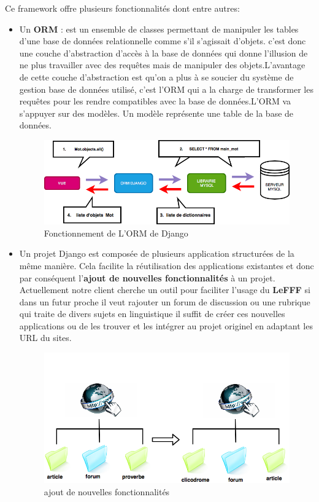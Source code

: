 \documentclass[a4paper, 12pt]{article}
\begin{document}
Ce framework offre plusieurs fonctionnalités dont entre autres:
\begin{itemize}
    \item Un \textbf{ORM} : est un ensemble de classes permettant de manipuler les tables d’une base de données relationnelle comme s’il s’agissait d’objets. c'est donc une couche d’abstraction d’accès à la base de données qui donne l’illusion de ne plus travailler avec des requêtes mais de manipuler des objets.L’avantage de cette couche d’abstraction est qu’on a plus à se soucier du système de gestion base de données utilisé, c’est l’ORM qui a la charge de transformer les requêtes pour les rendre compatibles avec la base de données.L’ORM va s’appuyer sur des modèles. Un modèle représente une table de la base de données.
    \begin{figure}[H] 
    \centering
    \includegraphics[scale=0.65]{orm.png}
    \caption{Fonctionnement de L'ORM de Django }
    \end{figure}
    \item Un projet Django est composée de plusieurs application structurées de la même manière. Cela facilite la réutilisation des applications existantes et  donc par conséquent l'\textbf{ajout de nouvelles fonctionnalités} à un projet. Actuellement notre client cherche un outil pour faciliter l'usage du \textbf{LeFFF} si dans un futur proche il veut rajouter un forum de discussion ou une rubrique qui traite de divers sujets en linguistique il suffit de créer ces nouvelles applications ou de les trouver et les intégrer au projet originel en adaptant les URL du sites. 
    \begin{figure}[H] 
    \centering
    \includegraphics[scale=0.65]{portabilite.png}
    \caption{ajout de nouvelles fonctionnalités }
    \end{figure}
\end{itemize}
\end{document}
